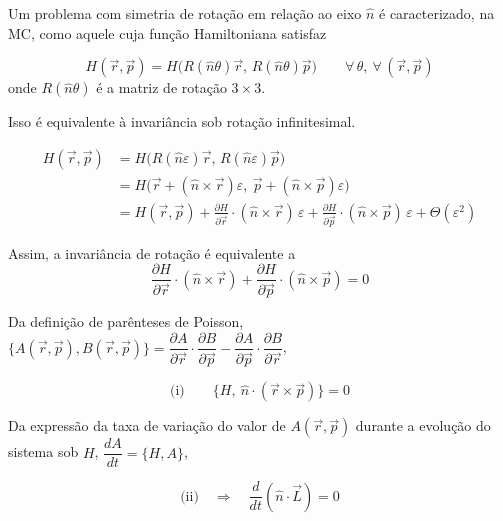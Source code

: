 Um problema com simetria de rotação em relação ao eixo $\hat{n}$ é caracterizado, na MC, como aquele cuja função Hamiltoniana satisfaz

\begin{equation}
    H(\vec{r},\vec{p}) = H\big(R(\hat{n}\theta)\vec{r},\, R(\hat{n}\theta)\vec{p}\big) \qquad \forall\,\theta,\ \forall\,(\vec{r},\vec{p})
\label{eq:aula21_invariancia_rotacao}
\end{equation}
onde $R(\hat{n}\theta)$ é a matriz de rotação $3\times 3$.

Isso é equivalente à invariância sob rotação infinitesimal.

\begin{align}
    H(\vec{r},\vec{p}) &= H\big(R(\hat{n}\varepsilon)\vec{r},\, R(\hat{n}\varepsilon)\vec{p}\big) \label{eq:aula21_invar_inf_1} \\
    &= H\big(\vec{r}+(\hat{n}\times\vec{r})\varepsilon,\ \vec{p}+(\hat{n}\times\vec{p})\varepsilon\big) \label{eq:aula21_invar_inf_2} \\
    &= H(\vec{r},\vec{p}) + \frac{\partial H}{\partial \vec{r}}\cdot(\hat{n}\times\vec{r})\,\varepsilon + \frac{\partial H}{\partial \vec{p}}\cdot(\hat{n}\times\vec{p})\,\varepsilon + \Theta(\varepsilon^2) \label{eq:aula21_invar_inf_3}
\end{align}

Assim, a invariância de rotação é equivalente a
\begin{equation}
    \frac{\partial H}{\partial \vec{r}}\cdot(\hat{n}\times\vec{r}) + \frac{\partial H}{\partial \vec{p}}\cdot(\hat{n}\times\vec{p}) = 0
\label{eq:aula21_invar_condicao}
\end{equation}

Da definição de parênteses de Poisson, $\{A(\vec{r},\vec{p}), B(\vec{r},\vec{p})\} = \dfrac{\partial A}{\partial \vec{r}}\cdot\dfrac{\partial B}{\partial \vec{p}} - \dfrac{\partial A}{\partial \vec{p}}\cdot\dfrac{\partial B}{\partial \vec{r}}$,

\begin{equation}
    \text{(i)} \qquad \boxed{\{H,\ \hat{n}\cdot(\vec{r}\times\vec{p})\} = 0}
\label{eq:aula21_invar_poisson}
\end{equation}

Da expressão da taxa de variação do valor de $A(\vec{r},\vec{p})$ durante a evolução do sistema sob $H$, $\dfrac{dA}{dt} = \{H, A\}$,

\begin{equation}
    \text{(ii)} \quad \Longrightarrow \quad \boxed{\frac{d}{dt}(\hat{n}\cdot\vec{L}) = 0}
\label{eq:aula21_invar_consequencia}
\end{equation}

